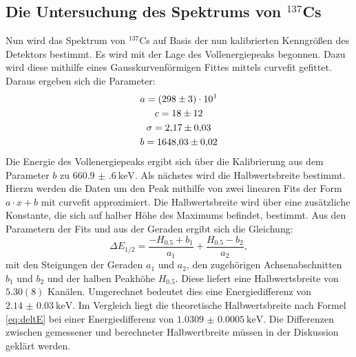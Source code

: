 \subsection{Die Untersuchung des Spektrums von $^{137}$Cs}
Nun wird das Spektrum von $^{137}$Cs auf Basis der nun kalibrierten Kenngrößen des Detektors bestimmt. Es wird mit der Lage des Vollenergiepeaks begonnen. Dazu wird diese mithilfe eines Gausskurvenförmigen Fittes mittels curvefit\cite{scipy} gefittet. Daraus ergeben sich die Parameter:
\begin{gather*}
a = \num{298(3)e1}\\
c = \num{18 \pm 12}\\
\sigma = \num{2.17(3)}\\
b = \num{1648.03(2)}
\end{gather*}
 Die Energie des Vollenergiepeaks ergibt sich über die Kalibrierung aus dem Parameter $b$ zu $\SI{660.9(6)}{\kilo\electronvolt}$.
 Als nächstes wird die Halbwertsbreite bestimmt. Hierzu werden die Daten um den Peak mithilfe von zwei linearen Fits der Form $ a \cdot x + b$ mit curvefit\cite{scipy} approximiert. Die Halbwertsbreite wird über eine zusätzliche Konstante, die sich auf halber Höhe des Maximums befindet, bestimmt. Aus den Parametern der Fits und aus der Geraden ergibt sich die Gleichung:
\begin{equation}
    \Delta E_\text{1/2} = \frac{-H_{0.5}+b_1}{a_1} + \frac{H_{0.5}-b_2}{a_2}, \label{eq:Z}
\end{equation}
mit den Steigungen der Geraden $a_1$ und $a_2$, den zugehörigen Achsenabschnitten $b_1$ und $b_2$ und der halben Peakhöhe $H_{0.5}$. Diese liefert eine Halbwertsbreite von $\si{5.30(8)}$ Kanälen. Umgerechnet bedeutet dies eine Energiedifferenz von $\SI{2.14(3)}{\kilo\electronvolt}$.
Im Vergleich liegt die theoretische Halbwertsbreite nach Formel \eqref{eq:deltE} bei einer Energiedifferenz von $\SI{1.0309(5)}{\kilo\electronvolt}$. Die Differenzen zwischen gemessener und berechneter Halbwertbreite müssen in der Diskussion geklärt werden. 
